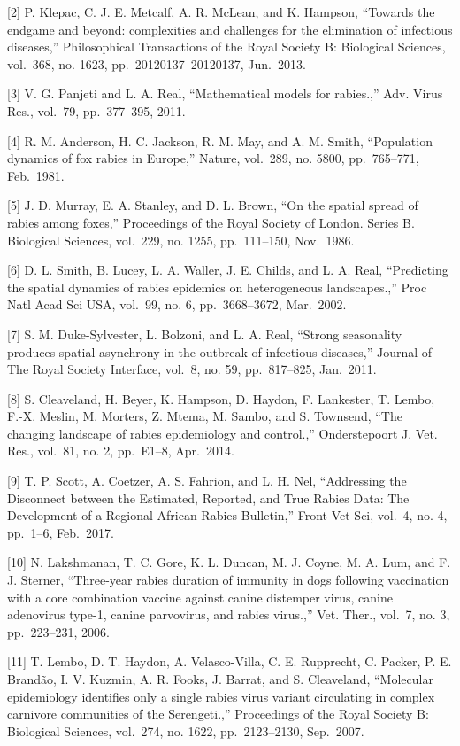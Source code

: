 \documentclass[
  oneside]{book}
\begin{document}
{[}2{]} P. Klepac, C. J. E. Metcalf, A. R. McLean, and K. Hampson, ``Towards the endgame and beyond: complexities and challenges for the elimination of infectious diseases,'' Philosophical Transactions of the Royal Society B: Biological Sciences, vol.~368, no. 1623, pp.~20120137--20120137, Jun.~2013.

{[}3{]} V. G. Panjeti and L. A. Real, ``Mathematical models for rabies.,'' Adv. Virus Res., vol.~79, pp.~377--395, 2011.

{[}4{]} R. M. Anderson, H. C. Jackson, R. M. May, and A. M. Smith, ``Population dynamics of fox rabies in Europe,'' Nature, vol.~289, no. 5800, pp.~765--771, Feb.~1981.

{[}5{]} J. D. Murray, E. A. Stanley, and D. L. Brown, ``On the spatial spread of rabies among foxes,'' Proceedings of the Royal Society of London. Series B. Biological Sciences, vol.~229, no. 1255, pp.~111--150, Nov.~1986.

{[}6{]} D. L. Smith, B. Lucey, L. A. Waller, J. E. Childs, and L. A. Real, ``Predicting the spatial dynamics of rabies epidemics on heterogeneous landscapes.,'' Proc Natl Acad Sci USA, vol.~99, no. 6, pp.~3668--3672, Mar.~2002.

{[}7{]} S. M. Duke-Sylvester, L. Bolzoni, and L. A. Real, ``Strong seasonality produces spatial asynchrony in the outbreak of infectious diseases,'' Journal of The Royal Society Interface, vol.~8, no. 59, pp.~817--825, Jan.~2011.

{[}8{]} S. Cleaveland, H. Beyer, K. Hampson, D. Haydon, F. Lankester, T. Lembo, F.-X. Meslin, M. Morters, Z. Mtema, M. Sambo, and S. Townsend, ``The changing landscape of rabies epidemiology and control.,'' Onderstepoort J. Vet. Res., vol.~81, no. 2, pp.~E1--8, Apr.~2014.

{[}9{]} T. P. Scott, A. Coetzer, A. S. Fahrion, and L. H. Nel, ``Addressing the Disconnect between the Estimated, Reported, and True Rabies Data: The Development of a Regional African Rabies Bulletin,'' Front Vet Sci, vol.~4, no. 4, pp.~1--6, Feb.~2017.

{[}10{]} N. Lakshmanan, T. C. Gore, K. L. Duncan, M. J. Coyne, M. A. Lum, and F. J. Sterner, ``Three-year rabies duration of immunity in dogs following vaccination with a core combination vaccine against canine distemper virus, canine adenovirus type-1, canine parvovirus, and rabies virus.,'' Vet. Ther., vol.~7, no. 3, pp.~223--231, 2006.

{[}11{]} T. Lembo, D. T. Haydon, A. Velasco-Villa, C. E. Rupprecht, C. Packer, P. E. Brandão, I. V. Kuzmin, A. R. Fooks, J. Barrat, and S. Cleaveland, ``Molecular epidemiology identifies only a single rabies virus variant circulating in complex carnivore communities of the Serengeti.,'' Proceedings of the Royal Society B: Biological Sciences, vol.~274, no. 1622, pp.~2123--2130, Sep.~2007.
\end{document}
